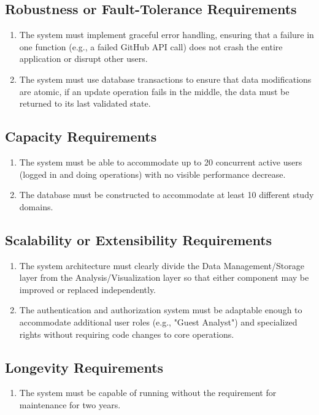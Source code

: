 \documentclass[12pt]{article}
\begin{document}
\subsection{Robustness or Fault-Tolerance Requirements}
\begin{enumerate}[label=PR-RFT\arabic*]
  \item The system must implement graceful error handling, ensuring that a failure in one function (e.g., a failed GitHub API call) does not crash the entire application or disrupt other users.
  \item The system must use database transactions to ensure that data modifications are atomic, if an update operation fails in the middle, the data must be returned to its last validated state.
\end{enumerate}
\subsection{Capacity Requirements}
\begin{enumerate}[label=PR-CR\arabic*]
  \item The system must be able to accommodate up to 20 concurrent active users (logged in and doing operations) with no visible performance decrease.
  \item The database must be constructed to accommodate at least 10 different study domains.
\end{enumerate}
\subsection{Scalability or Extensibility Requirements}
\begin{enumerate}[label=PR-SE\arabic*]
  \item The system architecture must clearly divide the Data Management/Storage layer from the Analysis/Visualization layer so that either component may be improved or replaced independently.
  \item The authentication and authorization system must be adaptable enough to accommodate additional user roles (e.g., "Guest Analyst") and specialized rights without requiring code changes to core operations.
\end{enumerate}
\subsection{Longevity Requirements}
\begin{enumerate}[label=PR-LR\arabic*]
  \item The system must be capable of running without the requirement for maintenance for two years. 
\end{enumerate}
\end{document}
